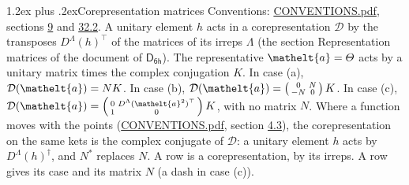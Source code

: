 \documentclass[10pt,a4paper]{article}
\makeatletter
\renewcommand\section{\@startsection{section}{1}{\z@}{-3ex plus -1ex minus -.2ex}%
  {1.2ex plus .2ex}{\normalfont\large\sffamily\bfseries\color{parttitle}}}
\numberwithin{equation}{section}
\newcommand{\eltfont}[1]{{\let\sigma\eltsigma\mathelt{#1}}}
\newcommand{\grp}[1]{\mathsf{#1}}
\newcommand{\elt}[1]{\eltfont{#1}}
\makeatother
\begin{document}
\section{Corepresentation matrices}\label{s:corep_matrices}
Conventions: \href{../../CONVENTIONS.pdf}{CONVENTIONS.pdf}, sections \href{../../../rotation/CONVENTIONS.pdf\#conv.9}{9} and \href{../../CONVENTIONS.pdf\#conv.32.2}{32.2}.
A unitary element $h$ acts in a corepresentation $\mathcal{D}$ by the transposes $D^{\Lambda}(h)^{\top}$ of the matrices of its irreps $\Lambda$ (the section Representation matrices of the document of \href{../../../rotation/data/pdf/D6h.pdf}{$\grp{D_{6h}}$}). The representative $\elt{a} = \varTheta$ acts by a unitary matrix times the complex conjugation $K$.
In case (a), $\mathcal{D}(\elt{a}) = NK$. In case (b), $\mathcal{D}(\elt{a}) = \left(\begin{smallmatrix} 0 & N \\ -N & 0 \end{smallmatrix}\right) K$. In case (c), $\mathcal{D}(\elt{a}) = \left(\begin{smallmatrix} 0 & D^{\Lambda}(\elt{a}^2)^{\top} \\ 1 & 0 \end{smallmatrix}\right) K$, with no matrix $N$.
Where a function moves with the points (\href{../../CONVENTIONS.pdf}{CONVENTIONS.pdf}, section \href{../../../rotation/CONVENTIONS.pdf\#conv.4.3}{4.3}), the corepresentation on the same kets is the complex conjugate of $\mathcal{D}$: a unitary element $h$ acts by $D^{\Lambda}(h)^{\dagger}$, and $N^{*}$ replaces $N$.
A row is a corepresentation, by its irreps. A row gives its case and its matrix $N$ (a dash in case (c)).
\end{document}
